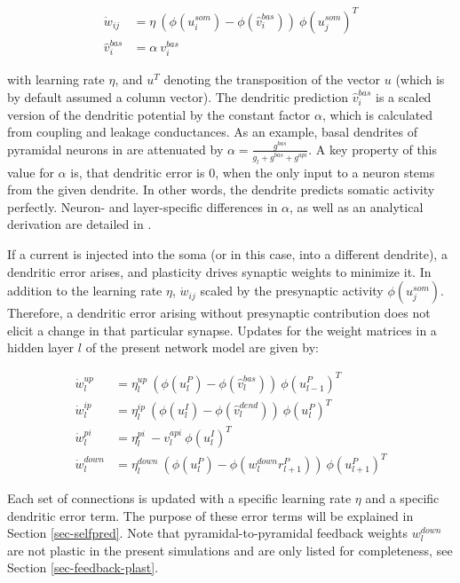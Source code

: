\begin{align}
  \dot{w}_{ij}    & = \eta \ ( \phi(u_i^{som}) - \phi(\hat{v}_i^{bas}) ) \ \phi(u_j^{som})^T \\
  \hat{v}_i^{bas} & = \alpha \  v_i^{bas}
\end{align}

with learning rate $\eta$, and $u^T$ denoting the transposition of the vector $u$ (which is by default assumed a column
vector). The dendritic prediction $\hat{v}_i^{bas}$ is a scaled version of the dendritic potential by the constant
factor $\alpha$, which is calculated from coupling and leakage conductances. As an example, basal dendrites of pyramidal
neurons in \cite{sacramento2018dendritic} are attenuated by $\alpha = \frac{g^{bas}}{g_l + g^{bas} + g^{api}}$. A key
property of this value for $\alpha$ is, that dendritic error is $0$, when the only input to a neuron stems from the
given dendrite. In other words, the dendrite predicts somatic activity perfectly. Neuron- and layer-specific
differences in $\alpha$, as well as an analytical derivation are detailed in \citep{sacramento2018dendritic}.

If a current is injected into the soma (or in this case, into a different dendrite), a dendritic error arises, and 
plasticity drives synaptic weights to minimize it. In addition to the learning rate $\eta$, $\dot{w}_{ij}$ scaled by the
presynaptic activity $\phi(u_j^{som})$. Therefore, a dendritic error arising without presynaptic contribution does not elicit a 
change in that particular synapse.  
Updates for the weight matrices in a hidden layer $l$ of the present
network model are given by:

\begin{align}
  \dot{w}_{l}^{up}   & = \eta_l^{up} \ ( \phi(u_l^{P}) - \phi(\hat{v}_l^{bas}) ) \ \phi(u_{l-1}^{P})^T\label{eq-delta_w_up}         \\
  \dot{w}_{l}^{ip}   & = \eta_l^{ip} \ ( \phi(u_l^{I}) - \phi(\hat{v}_l^{dend}) ) \ \phi(u_{l}^{P})^T\label{eq-delta_w_ip}          \\
  \dot{w}_{l}^{pi}   & = \eta_l^{pi} \ - v_l^{api} \ \phi(u_l^{I})^T\label{eq-delta_w_pi}                                           \\
  \dot{w}_{l}^{down} & = \eta_l^{down} \ ( \phi(u_l^{P}) - \phi(w_l^{down} r_{l+1}^P) )\ \phi(u_{l+1}^{P})^T\label{eq-delta_w_down}
\end{align}

Each set of connections is updated with a specific learning rate $\eta$ and a specific dendritic error term. The purpose
of these error terms will be explained in Section \ref{sec-selfpred}. 
Note that pyramidal-to-pyramidal feedback weights $w_l^{down}$ are not plastic in the present simulations and are only
listed for completeness, see Section \ref{sec-feedback-plast}.



